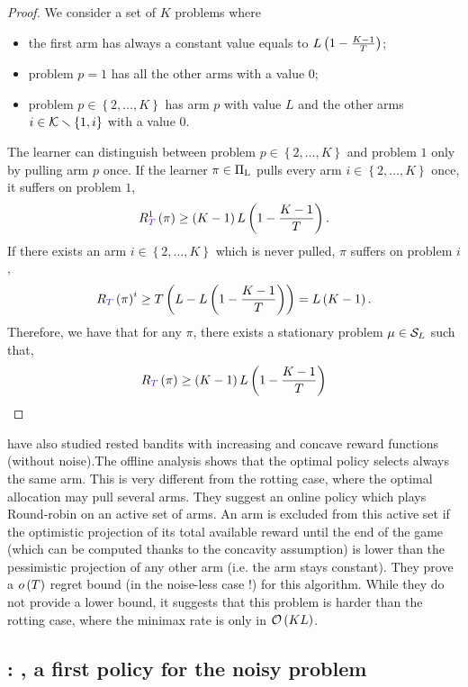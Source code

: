 \begin{proof}
We consider a set of $K$ problems where 
\begin{itemize}
\item the first arm has always a constant value equals to $L\left(1- \frac{K-1}{T}\right)$;
\item problem $p =1$ has all the other arms with a value $0$;
\item problem $p \in \left\lbrace 2, \dots, K \right\rbrace$ has arm $p$ with value $L$ and the other arms $i\in \mathcal{K} \smallsetminus \left\lbrace 1, i \right\rbrace$ with a value $0$.
\end{itemize}
The learner can distinguish between problem $p \in \left\lbrace 2, \dots, K \right\rbrace$ and problem $1$ only by pulling arm $p$ once. If the learner $\pi \in \Pi_{\rm L}$ pulls every arm $i \in \left\lbrace 2, \dots, K \right\rbrace$ once, it suffers on problem $1$,
\[\regret^1\pa{\pi} \geq \pa{K-1}L\pa{1- \frac{K-1}{T}}.\]
If there exists an arm $i \in \left\lbrace 2, \dots, K \right\rbrace$ which is never pulled, $\pi$ suffers on problem $i$,
\[\regret\pa{\pi}^i \geq T \pa{L - L\pa{1- \frac{K-1}{T}}}= L\pa{K-1}.\]
Therefore, we have that for any $\pi$, there exists a stationary problem $\mu \in \mathcal{S}_L$ such that,
\[\regret\pa{\pi} \geq \pa{K-1}L\pa{1- \frac{K-1}{T}}\]
\end{proof} 
\begin{remark}
\citet{heidari2016tight} have also studied rested bandits with increasing and concave reward functions (without noise).The offline analysis shows that the optimal policy selects always the same arm. This is very different from the rotting case, where the optimal allocation may pull several arms. They suggest an online policy which plays Round-robin on an active set of arms. An arm is excluded from this active set if the optimistic projection of its total available reward until the end of the game (which can be computed thanks to the concavity assumption) is lower than the pessimistic projection of any other arm (i.e. the arm stays constant). They prove a $o\left(T\right)$ regret bound (in the noise-less case !) for this algorithm. While they do not provide a lower bound, it suggests that this problem is harder than the rotting case, where the minimax rate is only in $\mathcal{O}\left(KL\right)$.
\end{remark}

\subsection{\citet{levine2017rotting} : {\wSWA}, a first policy for the noisy problem}
